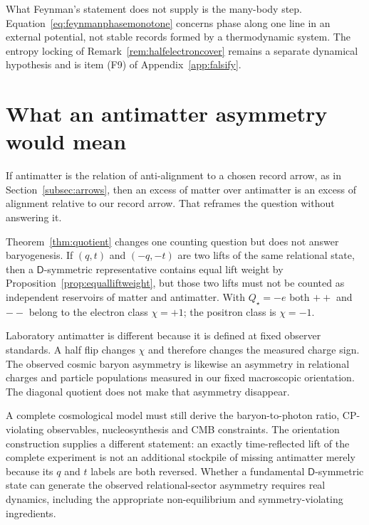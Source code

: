 \documentclass[11pt]{article}
\theoremstyle{definition}\newtheorem{definition}[theorem]{Definition}
\theoremstyle{remark}\newtheorem{remark}[theorem]{Remark}\newtheorem{conjecture}[theorem]{Conjecture}
\begin{document}
What Feynman's statement does not supply is the many-body step. Equation~\eqref{eq:feynmanphasemonotone} concerns phase along one line in an external potential, not stable records formed by a thermodynamic system. The entropy locking of Remark~\ref{rem:halfelectroncover} remains a separate dynamical hypothesis and is item (F9) of Appendix~\ref{app:falsify}.

\section{What an antimatter asymmetry would mean}
If antimatter is the relation of anti-alignment to a chosen record arrow, as in Section~\ref{subsec:arrows}, then an excess of matter over antimatter is an excess of alignment relative to our record arrow. That reframes the question without answering it.

Theorem~\ref{thm:quotient} changes one counting question but does not answer baryogenesis. If $(q,t)$ and $(-q,-t)$ are two lifts of the same relational state, then a $\mathsf D$-symmetric representative contains equal lift weight by Proposition~\ref{prop:equalliftweight}, but those two lifts must not be counted as independent reservoirs of matter and antimatter. With $Q_\star=-e$ both $++$ and $--$ belong to the electron class $\chi=+1$; the positron class is $\chi=-1$.

Laboratory antimatter is different because it is defined at fixed observer standards. A half flip changes $\chi$ and therefore changes the measured charge sign. The observed cosmic baryon asymmetry is likewise an asymmetry in relational charges and particle populations measured in our fixed macroscopic orientation. The diagonal quotient does not make that asymmetry disappear.

A complete cosmological model must still derive the baryon-to-photon ratio, CP-violating observables, nucleosynthesis and CMB constraints. The orientation construction supplies a different statement: an exactly time-reflected lift of the complete experiment is not an additional stockpile of missing antimatter merely because its $q$ and $t$ labels are both reversed. Whether a fundamental $\mathsf D$-symmetric state can generate the observed relational-sector asymmetry requires real dynamics, including the appropriate non-equilibrium and symmetry-violating ingredients.
\end{document}
